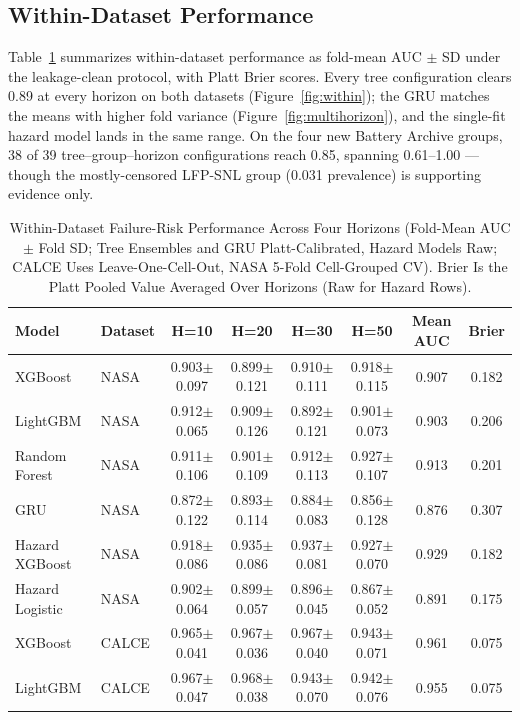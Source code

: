 \documentclass[11pt,a4paper]{article}
\begin{document}
\subsection{Within-Dataset Performance}
Table~\ref{tab:within} summarizes within-dataset performance as fold-mean AUC $\pm$ SD under the leakage-clean protocol, with Platt Brier scores. Every tree configuration clears 0.89 at every horizon on both datasets (Figure~\ref{fig:within}); the GRU matches the means with higher fold variance (Figure~\ref{fig:multihorizon}), and the single-fit hazard model lands in the same range. On the four new Battery Archive groups, 38 of 39 tree--group--horizon configurations reach 0.85, spanning 0.61--1.00 --- though the mostly-censored LFP-SNL group (0.031 prevalence) is supporting evidence only.

\begin{table}[!t]
\caption{Within-Dataset Failure-Risk Performance Across Four Horizons (Fold-Mean AUC $\pm$ Fold SD; Tree Ensembles and GRU Platt-Calibrated, Hazard Models Raw; CALCE Uses Leave-One-Cell-Out, NASA 5-Fold Cell-Grouped CV). Brier Is the Platt Pooled Value Averaged Over Horizons (Raw for Hazard Rows).}
\label{tab:within}
\centering
\footnotesize
\begin{tabular}{llcccccc}
\toprule
\textbf{Model} & \textbf{Dataset} & \textbf{H=10} & \textbf{H=20} & \textbf{H=30} & \textbf{H=50} & \textbf{Mean AUC} & \textbf{Brier}\\
\midrule
XGBoost & NASA & 0.903$\pm$0.097 & 0.899$\pm$0.121 & 0.910$\pm$0.111 & 0.918$\pm$0.115 & 0.907 & 0.182 \\
LightGBM & NASA & 0.912$\pm$0.065 & 0.909$\pm$0.126 & 0.892$\pm$0.121 & 0.901$\pm$0.073 & 0.903 & 0.206 \\
Random Forest & NASA & 0.911$\pm$0.106 & 0.901$\pm$0.109 & 0.912$\pm$0.113 & 0.927$\pm$0.107 & 0.913 & 0.201 \\
GRU & NASA & 0.872$\pm$0.122 & 0.893$\pm$0.114 & 0.884$\pm$0.083 & 0.856$\pm$0.128 & 0.876 & 0.307 \\
Hazard XGBoost & NASA & 0.918$\pm$0.086 & 0.935$\pm$0.086 & 0.937$\pm$0.081 & 0.927$\pm$0.070 & 0.929 & 0.182 \\
Hazard Logistic & NASA & 0.902$\pm$0.064 & 0.899$\pm$0.057 & 0.896$\pm$0.045 & 0.867$\pm$0.052 & 0.891 & 0.175 \\
XGBoost & CALCE & 0.965$\pm$0.041 & 0.967$\pm$0.036 & 0.967$\pm$0.040 & 0.943$\pm$0.071 & 0.961 & 0.075 \\
LightGBM & CALCE & 0.967$\pm$0.047 & 0.968$\pm$0.038 & 0.943$\pm$0.070 & 0.942$\pm$0.076 & 0.955 & 0.075 \\

\end{tabular}
\end{table}
\end{document}
